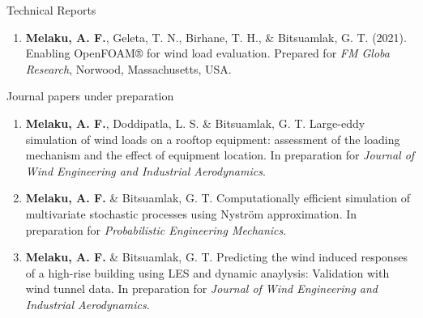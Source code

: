 \documentclass{resume} %
\begin{document}
\begin{rSection}{Technical Reports}
\begin{enumerate}

\item{\bf Melaku, A. F.}, Geleta, T. N., Birhane, T. H.,  \& Bitsuamlak, G. T. (2021). Enabling OpenFOAM® for wind load evaluation. Prepared for \emph{FM Globa Research}, Norwood, Massachusetts, USA. 

\end{enumerate}
\end{rSection}


\begin{rSection}{Journal papers under preparation}
\begin{enumerate}

\item {\bf Melaku, A. F.}, Doddipatla, L. S. \& Bitsuamlak, G. T. Large-eddy simulation of wind loads on a rooftop equipment: assessment of the loading mechanism and the effect of equipment location. In preparation for \emph{Journal of Wind Engineering and Industrial Aerodynamics}.

\item {\bf Melaku, A. F.} \& Bitsuamlak, G. T. Computationally efficient simulation of multivariate stochastic processes using Nyström approximation. In preparation for \emph{Probabilistic Engineering Mechanics}.

\item {\bf Melaku, A. F.} \& Bitsuamlak, G. T. Predicting the wind induced responses of a high-rise building using LES and dynamic anaylysis: Validation with wind tunnel data. In preparation for \emph{Journal of Wind Engineering and Industrial Aerodynamics}.


\end{enumerate}
\end{rSection}



\pagebreak
\end{document}
